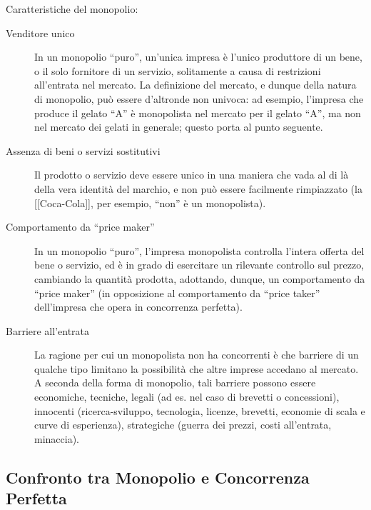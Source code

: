 Caratteristiche del monopolio:
\begin{description}
 \item [Venditore unico]
In un monopolio ``puro'', un'unica impresa è l'unico produttore di un bene, o 
il solo fornitore di un servizio, solitamente a causa di restrizioni 
all'entrata nel mercato. La definizione del mercato, e dunque della natura di 
monopolio, può essere d'altronde non univoca: ad esempio, l'impresa che produce 
il gelato ``A'' è monopolista nel mercato per il gelato ``A'', ma non nel 
mercato dei gelati in generale; questo porta al punto seguente.
 \item [Assenza di beni o servizi sostitutivi]
Il prodotto o servizio deve essere unico in una maniera che vada al di là 
della vera identità del marchio, e non può essere facilmente rimpiazzato (la 
[[Coca-Cola]], per esempio, ``non'' è un monopolista).
 \item [Comportamento da ``price maker'']
In un monopolio ``puro'', l'impresa monopolista controlla l'intera offerta del 
bene o servizio, ed è in grado di esercitare un rilevante controllo sul prezzo, 
cambiando la quantità prodotta, adottando, dunque, un comportamento da ``price 
maker'' (in opposizione al comportamento da ``price taker'' dell'impresa che 
opera in concorrenza perfetta).
 \item [Barriere all'entrata]
La ragione per cui un monopolista non ha concorrenti è che barriere di un 
qualche tipo limitano la possibilità che altre imprese accedano al mercato. A 
seconda della forma di monopolio, tali barriere possono essere economiche, 
tecniche, legali (ad es. nel caso di brevetti o concessioni), innocenti 
(ricerca-sviluppo, tecnologia, licenze, brevetti, economie di scala e curve di 
esperienza), strategiche (guerra dei prezzi, costi all'entrata, minaccia).
\end{description}

\subsection{Confronto tra Monopolio e Concorrenza Perfetta}

